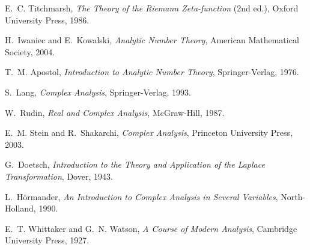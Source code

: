 \documentclass[11pt,a4paper]{article}
\theoremstyle{remark}
\begin{document}
\begin{thebibliography}{9}

E.~C. Titchmarsh, \emph{The Theory of the Riemann Zeta-function} (2nd ed.), Oxford University Press, 1986.

H.~Iwaniec and E.~Kowalski, \emph{Analytic Number Theory}, American Mathematical Society, 2004.

T.~M. Apostol, \emph{Introduction to Analytic Number Theory}, Springer-Verlag, 1976.

S.~Lang, \emph{Complex Analysis}, Springer-Verlag, 1993.

W.~Rudin, \emph{Real and Complex Analysis}, McGraw-Hill, 1987.

E.~M. Stein and R.~Shakarchi, \emph{Complex Analysis}, Princeton University Press, 2003.

G.~Doetsch, \emph{Introduction to the Theory and Application of the Laplace Transformation}, Dover, 1943.

L.~H\"ormander, \emph{An Introduction to Complex Analysis in Several Variables}, North-Holland, 1990.

E.~T. Whittaker and G.~N. Watson, \emph{A Course of Modern Analysis}, Cambridge University Press, 1927.

\end{thebibliography}
\end{document}
